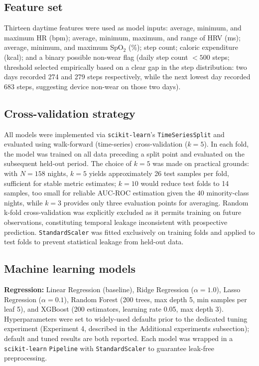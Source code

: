 \documentclass[fleqn,10pt]{wlscirep}
\begin{document}
\subsection*{Feature set}
Thirteen daytime features were used as model inputs: average, minimum, and maximum HR (bpm); average, minimum, maximum, and range of HRV (ms); average, minimum, and maximum SpO$_2$ (\%); step count; caloric expenditure (kcal); and a binary possible non-wear flag (daily step count $< 500$ steps; threshold selected empirically based on a clear gap in the step distribution: two days recorded 274 and 279 steps respectively, while the next lowest day recorded 683 steps, suggesting device non-wear on those two days).

\subsection*{Cross-validation strategy}
All models were implemented via \texttt{scikit-learn}'s \texttt{TimeSeriesSplit} and evaluated using walk-forward (time-series) cross-validation ($k = 5$). In each fold, the model was trained on all data preceding a split point and evaluated on the subsequent held-out period. The choice of $k = 5$ was made on practical grounds: with $N = 158$ nights, $k = 5$ yields approximately 26 test samples per fold, sufficient for stable metric estimates; $k = 10$ would reduce test folds to 14 samples, too small for reliable AUC-ROC estimation given the 40 minority-class nights, while $k = 3$ provides only three evaluation points for averaging. Random k-fold cross-validation was explicitly excluded as it permits training on future observations, constituting temporal leakage inconsistent with prospective prediction. \texttt{StandardScaler} was fitted exclusively on training folds and applied to test folds to prevent statistical leakage from held-out data.

\subsection*{Machine learning models}
\noindent\textbf{Regression:} Linear Regression (baseline), Ridge Regression ($\alpha = 1.0$), Lasso Regression ($\alpha = 0.1$), Random Forest (200 trees, max depth 5, min samples per leaf 5), and XGBoost (200 estimators, learning rate 0.05, max depth 3). Hyperparameters were set to widely-used defaults prior to the dedicated tuning experiment (Experiment 4, described in the Additional experiments subsection); default and tuned results are both reported. Each model was wrapped in a \texttt{scikit-learn} \texttt{Pipeline} with \texttt{StandardScaler} to guarantee leak-free preprocessing.
 
\end{document}
